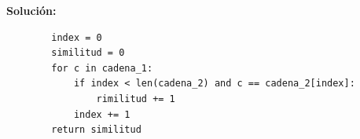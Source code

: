 \documentclass{article}
\begin{document}
\begin{enumerate}
		\textbf{Solución:}	
				
		\begin{lstlisting}
		index = 0
		similitud = 0
		for c in cadena_1:
			if index < len(cadena_2) and c == cadena_2[index]:
				rimilitud += 1
			index += 1
		return similitud		
		\end{lstlisting}
	\end{enumerate}
	

	
	
\end{document}
